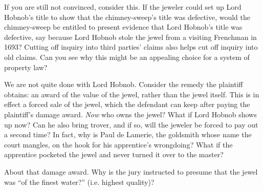 If you are still not convinced, consider this. If the jeweler could set up Lord
Hobnob's title to show that the chimney-sweep's title was defective, would the
chimney-sweep be entitled to present evidence that Lord Hobnob's title was
defective, say because Lord Hobnob stole the jewel from a visiting Frenchman in
1693? Cutting off inquiry into third parties' claims also helps cut off inquiry
into old claims. Can you see why this might be an appealing choice for a system
of property law?

\item We are not quite done with Lord Hobnob. Consider the remedy the plaintiff
obtains: an award of the value of the jewel, rather than the jewel itself. This
is in effect a forced sale of the jewel, which the defendant can keep after
paying the plaintiff's damage award. \textit{Now} who owns the jewel? What if
Lord Hobnob shows up now? Can he also bring trover, and if so, will the jeweler
be forced to pay out a second time? In fact, why is Paul de Lamerie, the
goldsmith whose name the court mangles, on the hook for his apprentice's
wrongdoing? What if the apprentice pocketed the jewel and never turned it over
to the master?

\item About that damage award. Why is the jury instructed to presume that the
jewel was ``of the finest water?'' (i.e. highest quality)?

